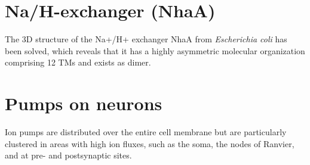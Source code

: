 \section{Na/H-exchanger (NhaA)}
\label{sec:NhaA}
\label{sec:Na-H-exchanger}

The 3D structure of the Na+/H+ exchanger NhaA from {\it Escherichia coli} has
been solved, which reveals that it has a highly asymmetric molecular
organization comprising 12 TMs and exists as dimer.

\section{Pumps on neurons}

Ion pumps are distributed over the entire cell membrane but
are particularly clustered in areas with high ion fluxes, such as
the soma, the nodes of Ranvier, and at pre- and postsynaptic
sites.

